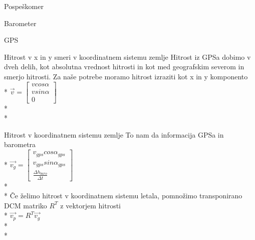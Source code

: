 \documentclass[]{article}
\begin{document}
\begin {subsection}{Pospeškomer}
\begin {subsection}{Barometer}
\begin {subsection}{GPS}
\begin{subsubsection}{Hitrost v x in y smeri v koordinatnem sistemu zemlje}
Hitrost iz GPSa dobimo v dveh delih, kot absolutna vrednost hitrosti in kot med geografskim severom in smerjo hitrosti. Za naše potrebe moramo hitrost izraziti kot x in y komponento\\*
$ \vec{v} = \left[ \begin{array}{c}
v cos\alpha \\ 
v sin\alpha \\ 
0
\end{array} \right] $\\*\\*

\end{subsubsection}
\begin {subsection}{Hitrost v koordinatnem sistemu zemlje}
To nam da informacija GPSa in barometra\\*
$ \vec{v_{g}} = \left[ \begin{array}{c}
v_{gps} cos\alpha_{gps} \\ 
v_{gps} sin\alpha_{gps} \\ 
\frac{\Delta h_{baro}}{\Delta t}
\end{array} \right] $\\*\\*
Če želimo hitrost v koordinatnem sistemu letala, pomnožimo transponirano DCM matriko $ R^{T} $ z vektorjem hitrosti\\*
$ \vec{v_{p}} = R^{T} \vec{v_{g}} $\\*\\*


\end{subsection}
\end{subsection}
\end{subsection}
\end{subsection}
\end{document}
